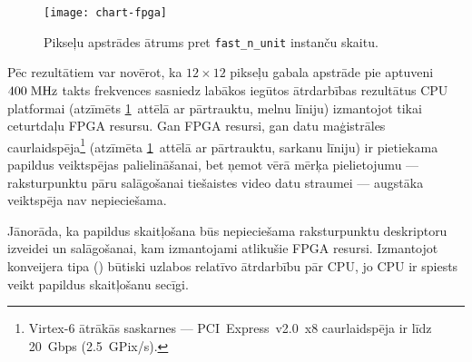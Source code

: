 \begin{figure}[tbh]
	\centering
	\texttt{[image: chart-fpga]}
	\caption{Pikseļu apstrādes ātrums pret \texttt{fast\_n\_unit} instanču skaitu.}
	\label{fig:test3-data}
\end{figure}

Pēc rezultātiem var novērot, ka $12 \times 12$ pikseļu gabala apstrāde pie
aptuveni $400\;\mathrm{MHz}$ takts frekvences sasniedz labākos iegūtos
ātrdarbības rezultātus CPU platformai
(atzīmēts \ref{fig:test3-data}~attēlā ar pārtrauktu, melnu līniju)
izmantojot tikai ceturtdaļu FPGA resursu.
Gan FPGA resursi, gan datu maģistrāles caurlaidspēja\footnote{
	Virtex-6 ātrākās saskarnes --- PCI~Express~v2.0~x8 caurlaidspēja
	ir līdz 20~Gbps (2.5~GPix/s).}
(atzīmēta \ref{fig:test3-data}~attēlā ar pārtrauktu, sarkanu līniju)
ir pietiekama papildus veiktspējas palielināšanai, bet ņemot vērā mērķa
pielietojumu --- raksturpunktu pāru salāgošanai tiešaistes video datu
straumei --- augstāka veiktspēja nav nepieciešama.

Jānorāda, ka papildus skaitļošana būs nepieciešama raksturpunktu
deskriptoru izveidei un salāgošanai, kam izmantojami atlikušie FPGA resursi.
Izmantojot konveijera tipa () būtiski uzlabos relatīvo
ātrdarbību pār CPU, jo CPU ir spiests veikt papildus skaitļošanu secīgi.

